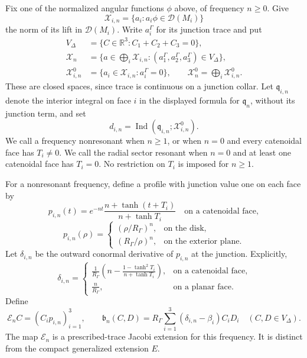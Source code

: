 \documentclass[11pt,twoside]{amsart}
\numberwithin{equation}{section}
\begin{document}
Fix one of the normalized angular functions $\phi$ above, of frequency $n\geq0$. Give
\[
\mathcal X_{i,n}=\{a_i:a_i\phi\in\mathcal D(M_i)\}
\]
the norm of its lift in $\mathcal D(M_i)$. Write $a_i^\Gamma$ for its junction trace and put
\[
\begin{split}
V_\Delta&=\{C\in\mathbb R^3:C_1+C_2+C_3=0\},\\
\mathcal X_n&=\{a\in\textstyle\bigoplus_i\mathcal X_{i,n}:
(a_1^\Gamma,a_2^\Gamma,a_3^\Gamma)\in V_\Delta\},\\
\mathcal X_{i,n}^0&=\{a_i\in\mathcal X_{i,n}:a_i^\Gamma=0\},
\qquad \mathcal X_n^0=\textstyle\bigoplus_i\mathcal X_{i,n}^0.
\end{split}
\]
These are closed spaces, since trace is continuous on a junction collar. Let $\mathfrak q_{i,n}$ denote the interior integral on face $i$ in the displayed formula for $\mathfrak q_n$, without its junction term, and set
\[
d_{i,n}=\operatorname{Ind}(\mathfrak q_{i,n};\mathcal X_{i,n}^0).
\]
We call a frequency nonresonant when $n\geq1$, or when $n=0$ and every catenoidal face has $T_i\ne0$. We call the radial sector resonant when $n=0$ and at least one catenoidal face has $T_i=0$. No restriction on $T_i$ is imposed for $n\geq1$.

For a nonresonant frequency, define a profile with junction value one on each face by
\[
p_{i,n}(t)=e^{-nt}\frac{n+\tanh(t+T_i)}{n+\tanh T_i}
\quad\text{on a catenoidal face},
\]
\[
p_{i,n}(\rho)=
\begin{cases}
(\rho/R_\Gamma)^n,&\text{on the disk},\\
(R_\Gamma/\rho)^n,&\text{on the exterior plane}.
\end{cases}
\]
Let $\delta_{i,n}$ be the outward conormal derivative of $p_{i,n}$ at the junction. Explicitly,
\[
\delta_{i,n}=
\begin{cases}
\displaystyle\frac{1}{R_\Gamma}
\left(n-\frac{1-\tanh^2T_i}{n+\tanh T_i}\right),
&\text{on a catenoidal face},\\[6pt]
\displaystyle\frac{n}{R_\Gamma},&\text{on a planar face}.
\end{cases}
\]
Define
\[
\mathscr E_n C=(C_ip_{i,n})_{i=1}^3,
\qquad
\mathfrak b_n(C,D)=R_\Gamma\sum_{i=1}^3
(\delta_{i,n}-\beta_i)C_iD_i
\quad(C,D\in V_\Delta).
\]
The map $\mathscr E_n$ is a prescribed-trace Jacobi extension for this frequency. It is distinct from the compact generalized extension $E$.
\end{document}
